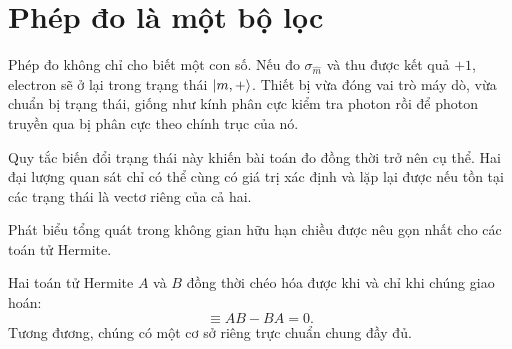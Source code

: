 \begin{classroomqa}
\end{classroomqa}

\section{Phép đo là một bộ lọc}

Phép đo không chỉ cho biết một con số. Nếu đo \(\sigma_{\hat m}\) và thu được kết quả \(+1\), electron sẽ ở lại trong trạng thái \(\left\lvert m,+\right\rangle\). Thiết bị vừa đóng vai trò máy dò, vừa chuẩn bị trạng thái, giống như kính phân cực kiểm tra photon rồi để photon truyền qua bị phân cực theo chính trục của nó.

Quy tắc biến đổi trạng thái này khiến bài toán đo đồng thời trở nên cụ thể. Hai đại lượng quan sát chỉ có thể cùng có giá trị xác định và lặp lại được nếu tồn tại các trạng thái là vectơ riêng của cả hai.

\begin{classroomqa}
\end{classroomqa}

Phát biểu tổng quát trong không gian hữu hạn chiều được nêu gọn nhất cho các toán tử Hermite.

\begin{theorem}
Hai toán tử Hermite \(A\) và \(B\) đồng thời chéo hóa được khi và chỉ khi chúng giao hoán:
\begin{equation}
  [A,B]\equiv AB-BA=0.
  \label{eq:l04-commutator}
\end{equation}
Tương đương, chúng có một cơ sở riêng trực chuẩn chung đầy đủ.
\end{theorem}

